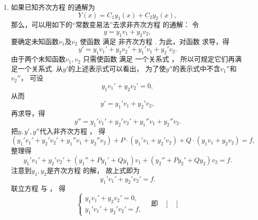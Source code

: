 \begin{enumerate}
	\item%
	如果已知齐次方程  的通解为\[
		Y(x) = C_1 y_1(x) + C_2 y_2(x),
	\]
	那么，可以用如下的“常数变易法”去求非齐次方程  的通解：
	令\begin{equation}\label{equation:微分方程.二阶非齐次线性微分方程的通解设想}
		y = y_1 v_1 + y_2 v_2,
	\end{equation}
	要确定未知函数\(v_1\)及\(v_2\)
	使函数  满足
	非齐次方程 .
	为此，对函数  求导，得\[
		y' = y_1 v_1' + y_2 v_2' + y_1' v_1 + y_2' v_2.
	\]
	由于两个未知函数\(v_1,v_2\)
	只需使函数  满足
	一个关系式 ，
	所以可规定它们再满足一个关系式.
	从\(y'\)的上述表示式可以看出，
	为了使\(y''\)的表示式中不含\(v_1''\)和\(v_2''\)，
	可设\begin{equation}\label{equation:微分方程.二阶非齐次线性微分方程的额外条件1}
		y_1 v_1' + y_2 v_2' = 0,
	\end{equation}
	从而\[
		y' = y_1' v_1 + y_2' v_2,
	\]
	再求导，得\[
		y'' = y_1' v_1' + y_2' v_2' + y_1'' v_1 + y_2'' v_2.
	\]
	把\(y,y',y''\)代入非齐次方程 ，
	得\[
		(y_1' v_1' + y_2' v_2' + y_1'' v_1 + y_2'' v_2)
		+P\cdot(y_1' v_1 + y_2' v_2) + Q\cdot(y_1 v_1 + y_2 v_2) = f,
	\]
	整理得\[
		y_1' v_1' + y_2' v_2'
		+ (y_1'' + P y_1' + Q y_1) v_1
		+ (y_2'' + P y_2' + Q y_2) v_2
		= f.
	\]
	注意到\(y_1,y_2\)是齐次方程  的解，
	故上式即为
	\begin{equation}\label{equation:微分方程.二阶非齐次线性微分方程的额外条件2}
		y_1' v_1' + y_2' v_2' = f.
	\end{equation}
	联立方程 
	与 ，
	得\[
		\left\{ \begin{array}{l}
			y_1 v_1' + y_2 v_2' = 0, \\
			y_1' v_1' + y_2' v_2' = f,
		\end{array} \right.
		\quad\text{即}\quad
		\begin{bmatrix}

\end{bmatrix}\]
\end{enumerate}
